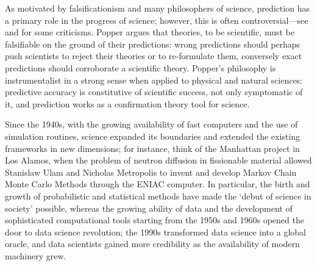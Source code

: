 \documentclass{statsoc}
\begin{document}
As motivated by falsificationism
\citep{popper1934logic} and many philosophers of science, prediction has a primary role in the progress of science; however, this is often controversial---see \cite{kuhn1962structure} and \cite{lakatos1976falsification} for some criticisms. Popper argues 
that theories, to be scientific, must be falsifiable on the ground of their  predictions: wrong predictions should perhaps push scientists to reject their theories or to 
re-formulate them, conversely exact predictions should corroborate a scientific theory. Popper's philosophy is instrumentalist 
in a strong sense \citep{hitchcock2004prediction} when applied to physical and natural sciences: predictive accuracy is constitutive of scientific success, not only symptomatic of it, and  prediction works as a confirmation theory tool for science.   

Since the 1940s, with the growing availability of fast computers and the use of simulation routines, science expanded its boundaries and extended the existing frameworks in new dimensions; for instance, think of the Manhattan project in Los Alamos, when the problem of neutron diffusion in fissionable material allowed Stanislaw Ulam and Nicholas Metropolis to invent and develop Markov Chain Monte Carlo Methods through the ENIAC computer. In particular, the birth 
and growth of probabilistic and statistical methods have made the `debut of science in society' possible, whereas the growing ability of data and the development of sophisticated computational 
tools starting from the 1950s and 1960s opened the door to data science revolution; the 1990s transformed  data science into a 
global oracle, and data scientists gained more credibility as the availability of  modern machinery grew.
\end{document}
